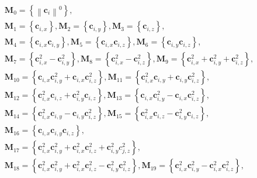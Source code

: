 \begin{align}
\begin{split}
    & \boldsymbol{M}_0=\left\{\left\|\boldsymbol{c}_i\right\|^0\right\}, \\
    & \boldsymbol{M}_1=\left\{\boldsymbol{c}_{i, x}\right\}, \boldsymbol{M}_2=\left\{\boldsymbol{c}_{i, y}\right\}, \boldsymbol{M}_3=\left\{\boldsymbol{c}_{i, z}\right\}, \\
    & \boldsymbol{M}_4=\left\{\boldsymbol{c}_{i, x} \boldsymbol{c}_{i, y}\right\}, \boldsymbol{M}_5=\left\{\boldsymbol{c}_{i, x} \boldsymbol{c}_{i, z}\right\}, \boldsymbol{M}_6=\left\{\boldsymbol{c}_{i, y} \boldsymbol{c}_{i, z}\right\}, \\
    & \boldsymbol{M}_7=\left\{\boldsymbol{c}_{i, x}^2-\boldsymbol{c}_{i, y}^2\right\}, \boldsymbol{M}_8=\left\{\boldsymbol{c}_{i, x}^2-\boldsymbol{c}_{i, z}^2\right\}, \boldsymbol{M}_9=\left\{\boldsymbol{c}_{i, x}^2+\boldsymbol{c}_{i, y}^2+\boldsymbol{c}_{i, z}^2\right\}, \\
    & \boldsymbol{M}_{10}=\left\{\boldsymbol{c}_{i, x} \boldsymbol{c}_{i, y}^2+\boldsymbol{c}_{i, x} \boldsymbol{c}_{i, z}^2\right\}, \boldsymbol{M}_{11}=\left\{\boldsymbol{c}_{i, x}^2 \boldsymbol{c}_{i, y}+\boldsymbol{c}_{i, y} \boldsymbol{c}_{i, z}^2\right\}, \\
    & \boldsymbol{M}_{12}=\left\{\boldsymbol{c}_{i, x}^2 \boldsymbol{c}_{i, z}+\boldsymbol{c}_{i, y}^2 \boldsymbol{c}_{i, z}\right\}, \boldsymbol{M}_{13}=\left\{\boldsymbol{c}_{i, x} \boldsymbol{c}_{i, y}^2-\boldsymbol{c}_{i, x} \boldsymbol{c}_{i, z}^2\right\}, \\
    & \boldsymbol{M}_{14}=\left\{\boldsymbol{c}_{i, x}^2 \boldsymbol{c}_{i, y}-\boldsymbol{c}_{i, y} \boldsymbol{c}_{i, z}^2\right\}, \boldsymbol{M}_{15}=\left\{\boldsymbol{c}_{i, x}^2 \boldsymbol{c}_{i, z}-\boldsymbol{c}_{i, y}^2 \boldsymbol{c}_{i, z}\right\}, \\
    & \boldsymbol{M}_{16}=\left\{\boldsymbol{c}_{i, x} \boldsymbol{c}_{i, y} \boldsymbol{c}_{i, z}\right\}, \\
    & \boldsymbol{M}_{17}=\left\{\boldsymbol{c}_{i, x}^2 \boldsymbol{c}_{i, y}^2+\boldsymbol{c}_{i, x}^2 \boldsymbol{c}_{i, z}^2+\boldsymbol{c}_{i, y}^2 c_{j, z}^2\right\}, \\
    & \boldsymbol{M}_{18}=\left\{\boldsymbol{c}_{i, x}^2 \boldsymbol{c}_{i, y}^2+\boldsymbol{c}_{i, x}^2 \boldsymbol{c}_{i, z}^2-\boldsymbol{c}_{i, y}^2 \boldsymbol{c}_{i, z}^2\right\}, \boldsymbol{M}_{19}=\left\{\boldsymbol{c}_{i, x}^2 \boldsymbol{c}_{i, y}^2-\boldsymbol{c}_{i, x}^2 \boldsymbol{c}_{i, z}^2\right\}, \\

\end{split}
\end{align}
